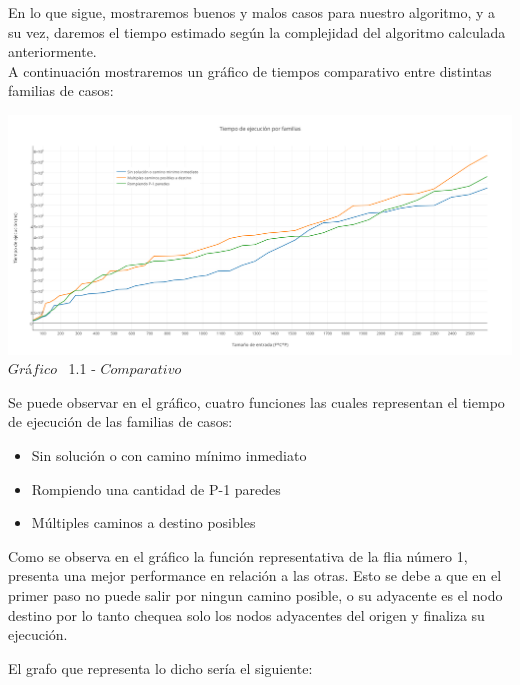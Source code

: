 \indent En lo que sigue, mostraremos buenos y malos casos para nuestro algoritmo, y a su vez, daremos el tiempo estimado 
seg\'un la complejidad del algoritmo calculada anteriormente.\\


A continuaci\'on mostraremos un gr\'afico de tiempos comparativo entre distintas familias de casos:\\ 

\vspace*{0.3cm} \vspace*{0.3cm}
  \begin{center}
 \includegraphics[scale=0.65]{./EJ1/comparativo.png}
 {$Gr$\'a$fico$ \ 1.1 - $Comparativo$}
  \end{center}
  \vspace*{0.3cm}
  
Se puede observar en el gr\'afico, cuatro funciones las cuales representan el tiempo de ejecuci\'on de las familias de casos:\\
\begin{itemize}
\item Sin soluci\'on o con camino m\'inimo inmediato
\item Rompiendo una cantidad de P-1 paredes
\item M\'ultiples caminos a destino posibles
\end{itemize}


Como se observa en el gr\'afico la funci\'on representativa de la flia n\'umero 1, presenta una mejor performance en relaci\'on a las otras. Esto se debe a que en el primer paso no puede salir por ningun camino posible, o su adyacente es el nodo destino por lo tanto chequea solo los nodos adyacentes del origen y finaliza su ejecuci\'on.


El grafo que representa lo dicho ser\'ia el siguiente:\\

